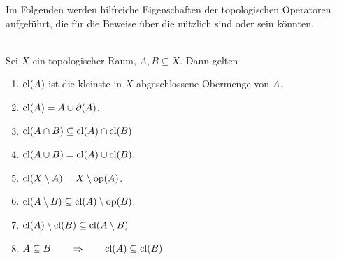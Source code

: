     Im
    Folgenden werden hilfreiche Eigenschaften der topologischen Operatoren aufgeführt, die für die Beweise über die \strukt nützlich sind oder sein könnten.
    \begin{satz} \label{satz:cl}\ \\
        Sei $X$ ein topologischer Raum, $A, B \subseteq X$. Dann gelten
        \begin{enumerate}
            \item \label{satz:cl.1} $\text{cl}(A)$ ist die kleinste in $X$ abgeschlossene Obermenge von $A$.
            \item \label{satz:cl.2} $\text{cl}(A) = A \cup \partial(A)$.
            \item \label{satz:cl.3} $\text{cl}(A \cap B) \subseteq \text{cl}(A) \cap \text{cl}(B)$
            \item \label{satz:cl.4} $\text{cl}(A \cup B) = \text{cl}(A) \cup \text{cl}(B)$.
            \item \label{satz:cl.5} $\text{cl}(X \setminus A) = X \setminus \text{op}(A)$. 
            \item \label{satz:cl.6} $\text{cl}(A \setminus B) \subseteq \text{cl}(A) \setminus \text{op}(B)$. 
            \item \label{satz:cl.7} $\text{cl}(A) \setminus \text{cl}(B) \subseteq \text{cl}(A \setminus B)$
            \item \label{satz:cl.8} $A \subseteq B \quad \quad \Rightarrow \quad \quad \text{cl}(A) \subseteq \text{cl}(B)$ 
        \end{enumerate}	
        
    \end{satz}

